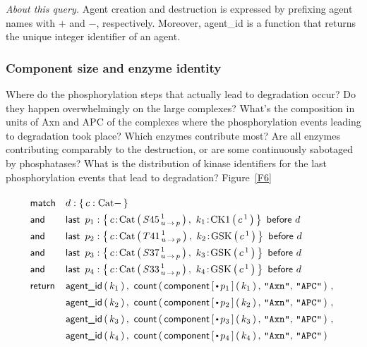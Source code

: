 \noindent \textit{About this query.} Agent creation and destruction is
expressed by prefixing agent names with $+$ and $-$,
respectively. Moreover, \textsf{agent\_id} is a function that returns
the unique integer identifier of an agent.


\subsubsection*{Component size and enzyme identity} 
Where do the phosphorylation steps that actually lead to degradation
occur? Do they happen overwhelmingly on the large complexes? What’s
the composition in units of Axn and APC of the complexes where the
phosphorylation events leading to degradation took place?  Which
enzymes contribute most? Are all enzymes contributing comparably to
the destruction, or are some continuously sabotaged by phosphatases?
What is the distribution of kinase identifiers for the last
phosphorylation events that lead to degradation? Figure~\ref{F6}

\newcommand{\BigHectorStoryLine}[4]{
\LastBefore{#1:\Set{ 
          \iAG{c}{\BetaCat}{ {#2}^{\,1}_{\Trans{u}{p}}}, \ 
          \iAG{#3}{#4}{c^{\,1}}
    }}{d}
}
\newcommand{\BigHectorStoryRet}[2]{
\AgentId{#2}, \ \Count{ \Component{\StateBefore{#1}}{#2}, \, 
      \STR{Axn}, \, \STR{APC} }
}


\begin{small}
\begin{equation}
  \Query{
    \m{match} & d:\Set{ c:\BetaCat - } \\
    \m{and} & \BigHectorStoryLine{p_1}{S45}{k_1}{\CKOne} \\
    \m{and} & \BigHectorStoryLine{p_2}{T41}{k_2}{\GSK}   \\
    \m{and} & \BigHectorStoryLine{p_3}{S37}{k_3}{\GSK}   \\
    \m{and} & \BigHectorStoryLine{p_4}{S33}{k_4}{\GSK}   \\
    \m{return} 
    & \BigHectorStoryRet{p_1}{k_1} \,,\  \\
    & \BigHectorStoryRet{p_2}{k_2} \,,\ \\
    & \BigHectorStoryRet{p_3}{k_3} \,,\  \\
    & \BigHectorStoryRet{p_4}{k_4} \\
  }
\end{equation}
\end{small}

